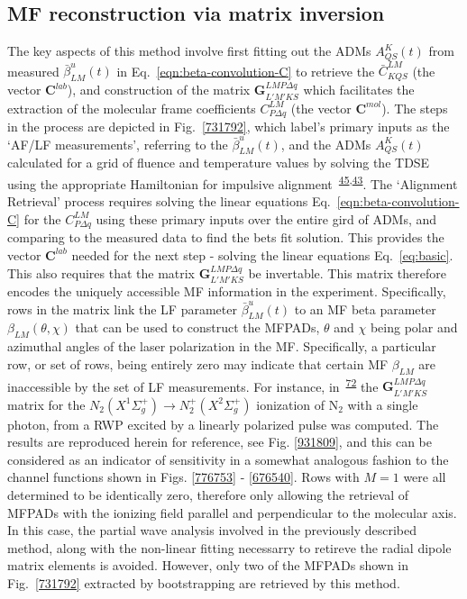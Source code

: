 \documentclass[10pt]{article}
\begin{document}
\subsection{MF reconstruction via matrix inversion\label{sec:Matrix-inversion-example}}

The key aspects of this method involve first fitting out the ADMs $A^K_{QS}(t)$ from measured $\bar{\beta}^u_{LM}(t)$ in Eq.~\ref{eqn:beta-convolution-C} to retrieve the $\bar{C}^{LM}_{KQS}$ (the vector $\mathbf{C}^{lab}$), and construction of the matrix $\mathbf{{G}}^{LMP\Delta q }_{L'M'KS}$ which facilitates the extraction of the molecular frame coefficients $C^{LM}_{P\Delta q}$ (the vector $\mathbf{C}^{mol}$). The steps in the process are depicted in Fig.~\ref{731792}, which label's primary inputs as the `AF/LF measurements', referring to the $\bar{\beta}^u_{LM}(t)$, and the ADMs $A^K_{QS}(t)$ calculated for a grid of fluence and temperature values by solving the TDSE using the appropriate Hamiltonian for impulsive alignment~\textsuperscript{\hyperref[csl:45]{45},\hyperref[csl:43]{43}}. 
The `Alignment Retrieval' process requires solving the linear equations Eq.~\ref{eqn:beta-convolution-C} for the $C^{LM}_{P\Delta q}$ using these primary inputs over the entire gird of ADMs, and comparing to the measured data to find the bets fit solution. This provides the vector $\mathbf{C}^{lab}$ needed for the next step - solving the linear equations Eq.~\ref{eq:basic}. This also requires that the matrix $\mathbf{{G}}^{LMP\Delta q }_{L'M'KS}$ be invertable. This matrix therefore encodes the uniquely accessible MF information in the experiment. Specifically, rows in the matrix link the LF parameter $\bar{\beta}^u_{LM}(t)$  to an MF beta parameter $\beta_{LM}(\theta,\chi)$ that can be used to construct the MFPADs, $\theta$ and $\chi$ being polar and azimuthal angles of the laser polarization in the MF. Specifically, a particular row, or set of rows, being entirely zero may indicate that certain MF $\beta_{LM}$ are inaccessible by the set of LF measurements. For instance, in~\textsuperscript{\hyperref[csl:72]{72}} the $\mathbf{{G}}^{LMP\Delta q }_{L'M'KS}$ matrix for the $N_2(X^{1}\Sigma^{+}_{g}) \rightarrow N^+_2(X^{2}\Sigma^{+}_{g})$ ionization of N$_2$ with a single photon, from a RWP excited by a linearly polarized pulse was computed. The results are reproduced herein for reference, see Fig. \ref{931809}, and this can be considered as an indicator of sensitivity in a somewhat analogous fashion to the channel functions shown in Figs. \ref{776753} - \ref{676540}. Rows with $M = 1$ were all determined to be identically zero, therefore only allowing the retrieval of MFPADs with the ionizing field parallel and perpendicular to the molecular axis. In this case, the partial wave analysis involved in the previously described method, along with the non-linear fitting necessarry to retireve the radial dipole matrix elements is avoided. However, only two of the MFPADs shown in Fig.~\ref{731792} extracted by bootstrapping are retrieved by this method.\\
\end{document}
